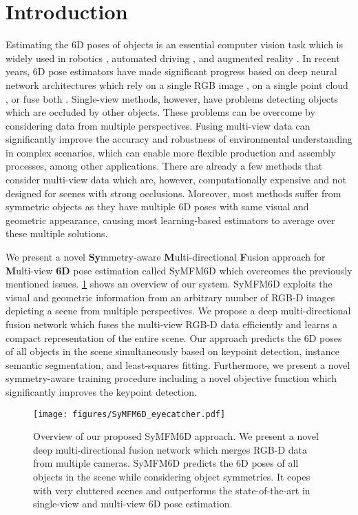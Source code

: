 \section{Introduction}

Estimating the 6D poses of objects is an essential computer vision task which is widely used in robotics \cite{posecnn, pvn3d, ffb6d}, automated driving \cite{avod, gu2021ecpc_icp}, and augmented reality \cite{arSurvey, su2019ar}.
In recent years, 6D pose estimators have made significant progress based on deep neural network architectures which rely on a single RGB image \cite{posecnn, so_pose, zebrapose}, on a single point cloud \cite{pointvotenet2020, votingAttentionPoseEst22},
or fuse both \cite{densefusion, pvn3d, ffb6d}. 
Single-view methods, however, have problems detecting objects which are occluded by other objects.
These problems can be overcome by considering data from multiple perspectives.
Fusing multi-view data can significantly improve the accuracy and robustness of environmental understanding in complex scenarios, which can enable more flexible production and assembly processes, among other applications.
There are already a few methods that consider multi-view data \cite{zeng2017multi, li2018unified, cosypose} which are, however, computationally expensive and not designed for scenes with strong occlusions. Moreover, most methods suffer from symmetric objects as they have multiple 6D poses with same visual and geometric appearance, causing most learning-based estimators to average over these multiple solutions.

We present a novel \textbf{Sy}mmetry-aware \textbf{M}ulti-directional \textbf{F}usion approach for \textbf{M}ulti-view \textbf{6D} pose estimation called SyMFM6D which overcomes the previously mentioned issues. \cref{fig_eye_catcher} shows an overview of our system. 
SyMFM6D exploits the visual and geometric information from an arbitrary number of RGB-D images depicting a scene from multiple perspectives. We propose a deep multi-directional fusion network which fuses the multi-view RGB-D data efficiently and learns a compact representation of the entire scene. Our approach predicts the 6D poses of all objects in the scene simultaneously based on keypoint detection, instance semantic segmentation, and least-squares fitting. Furthermore, we present a novel symmetry-aware training procedure including a novel objective function which significantly improves the keypoint detection. 

\begin{figure}[t]
  \centering 
  \texttt{[image: figures/SyMFM6D\_eyecatcher.pdf]}
   \caption{Overview of our proposed SyMFM6D approach. We present a novel deep multi-directional fusion network which merges RGB-D data from multiple cameras. SyMFM6D predicts the 6D poses of all objects in the scene while considering object symmetries. It copes with very cluttered scenes and outperforms the state-of-the-art in single-view and multi-view 6D pose estimation.}
   \label{fig_eye_catcher}
\end{figure}

